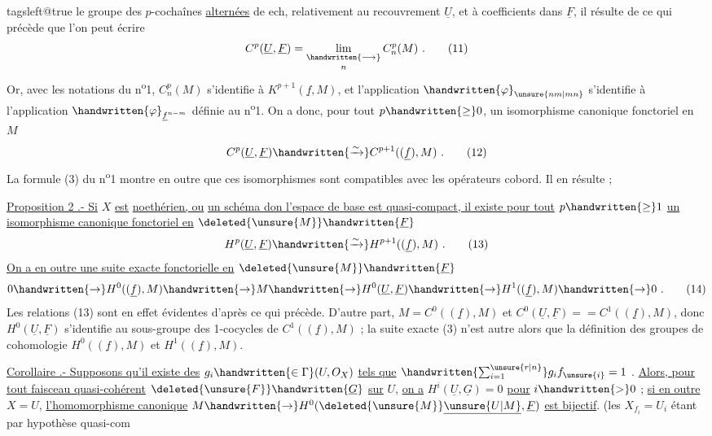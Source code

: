 \begingroup
\csname tagsleft@true\endcsname
le groupe des $p$-cochaînes \uline{alternées} de \leavevmode{}\handwritten{\v{\phantom{C}}}ech, relativement au recouvrement $\underline U$, et à  coefficients dans $\underline F$, il résulte de ce qui précède que l'on peut écrire
\[
C^p(\underline U,\underline F)=\mathop{\underset{\handwritten{\longrightarrow}}{\lim}}\limits_n C_n^p(M)\ .\tag*{(11)}
\]
Or, avec les notations du n\textsuperscript{o}1, $C_n^p(M)$ s'identifie à $K^{p+1}(\underline f,M)$, et l'application $\handwritten{\varphi}_{\unsure{nm|mn}}$ s'identifie à l'application $\handwritten{\varphi}_{\underline f^{n-m}}$ définie au n\textsuperscript{o}1. On a donc, pour tout $p\handwritten{\geq}0$, un isomorphisme canonique  fonctoriel en $M$
\[
C^p(\underline U,\underline F)\handwritten{\xrightarrow{\sim}}C^{p+1}((\underline f),M)\ .\tag*{(12)}
\]
La formule (3) du n\textsuperscript{o}1 montre en outre que ces isomorphismes sont compatibles avec les opérateurs cobord. Il en résulte ;

\uline{Proposition 2 .- Si} $X$ \uline{est}  \uline{noethérien, ou}  \uline{un schéma don l'espace de base est quasi-compact, il existe pour tout} $p\handwritten{\geq}1$ \uline{un isomorphisme canonique fonctoriel en} $\deleted{\unsure{M}}\handwritten{\underline F}$
\[
H^p(\underline U,\underline F)\handwritten{\xrightarrow{\sim}}H^{p+1}((\underline f),M)\ .\tag*{(13)}
\]
\uline{On a en outre une suite exacte fonctorielle en} $\deleted{\unsure{M}}\handwritten{\underline F}$
\[
0\handwritten{\to}H^0((\underline f),M)\handwritten{\to}M\handwritten{\to}H^0(\underline U,\underline F)\handwritten{\to}H^1((\underline f),M)\handwritten{\to}0\ .\tag*{(14)}
\]
Les relations (13) sont en effet évidentes d'après ce qui précède. D'autre part,  $M=C^0((\underline f),M)$ et  $C^0(\underline U,\underline F)={}=C^1((\underline f),M)$, donc $H^0(\underline U,\underline F)$ s'identifie au sous-groupe des 1-cocycles de $C^1((\underline f),M)$ ; la suite exacte (3) n'est autre alors que  la définition des groupes de cohomologie $H^0((\underline f),M)$ et $H^1((\underline f),M)$.

\uline{Corollaire .- Supposons qu'il existe des} $g_i\handwritten{\in\Gamma}(U,O_X)$ \uline{tels que} $\handwritten{\sum_{i=1}^{\unsure{r|n}}}g_i f_{\unsure{i}}=1$ . \uline{Alors, pour tout faisceau quasi-cohérent}  $\deleted{\unsure{F}}\handwritten{\underline G}$ \uline{sur} $U$, \uline{on a} $H^i(\underline U,\underline G)=0$ \uline{pour} $i\handwritten{>}0$ ; \uline{si en outre} $X=U$, \uline{l'homomorphisme canonique} $M\handwritten{\to}H^0(\deleted{\unsure{M}}\underline{\unsure{U|M}},\underline F)$ \uline{est bijectif}. (les $X_{f_i}=U_i$ étant par hypothèse quasi-com

